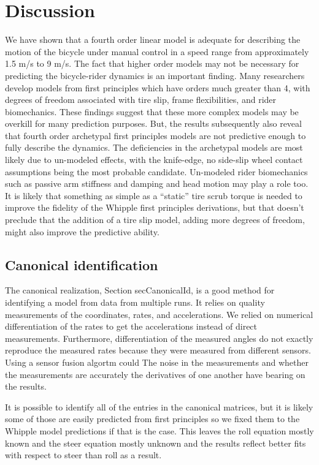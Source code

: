 \documentclass[a4paper]{article}
\begin{document}
\section{Discussion}

We have shown that a fourth order linear model is adequate for describing the
motion of the bicycle under manual control in a speed range from approximately
1.5 m/s to 9 m/s. The fact that higher order models may not be necessary for
predicting the bicycle-rider dynamics is an important finding.  Many
researchers develop models from first principles which have orders much greater
than 4, with degrees of freedom associated with tire slip, frame flexibilities,
and rider biomechanics. These findings suggest that these more complex models
may be overkill for many prediction purposes. But, the results subsequently
also reveal that fourth order archetypal first principles models are not
predictive enough to fully describe the dynamics. The deficiencies in the
archetypal models are most likely due to un-modeled effects, with the
knife-edge, no side-slip wheel contact assumptions being the most probable
candidate. Un-modeled rider biomechanics such as passive arm stiffness and
damping and head motion may play a role too. It is likely that something as
simple as a ``static'' tire scrub torque is needed to improve the fidelity of
the Whipple first principles derivations, but that doesn't preclude that the
addition of a tire slip model, adding more degrees of freedom, might also
improve the predictive ability.

\subsection{Canonical identification}

The canonical realization, Section secCanonicalId, is a good method for
identifying a model from data from multiple runs. It relies on quality
measurements of the coordinates, rates, and accelerations. We relied on
numerical differentiation of the rates to get the accelerations instead of
direct measurements. Furthermore, differentiation of the measured angles do not
exactly reproduce the measured rates because they were measured from different
sensors. Using a sensor fusion algortm could The noise in the measurements and
whether the measurements are accurately the derivatives of one another have
bearing on the results.

It is possible to identify all of the entries in the canonical matrices, but it
is likely some of those are easily predicted from first principles so we fixed
them to the Whipple model predictions if that is the case. This leaves the roll
equation mostly known and the steer equation mostly unknown and the results
reflect better fits with respect to steer than roll as a result.
\end{document}
